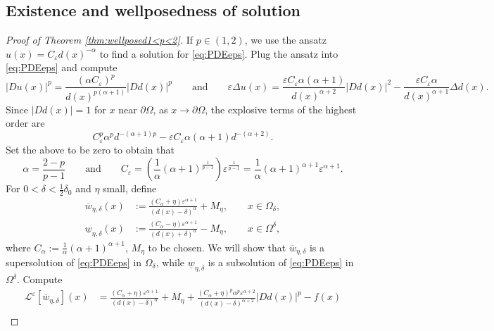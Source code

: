 \documentclass[12pt,reqno]{amsart}
\numberwithin{figure}{section}
\theoremstyle{plain}
\theoremstyle{remark}
\numberwithin{equation}{section}
\begin{document}
\subsection*{Existence and wellposedness of solution}
\begin{proof} [Proof of Theorem \ref{thm:wellposed1<p<2}] If $p\in (1,2)$, we use the ansatz $ u(x) = C_\varepsilon d(x)^{-\alpha}$ to find a solution for \eqref{eq:PDEeps}. Plug the ansatz into \eqref{eq:PDEeps} and compute 
\begin{equation*}
    |Du (x)|^p = \frac{(\alpha C_\varepsilon)^p }{d(x)^{p(\alpha+1)}}|D d(x)|^p \qquad\text{and}\qquad\varepsilon\Delta u(x) = \frac{\varepsilon C_\varepsilon\alpha(\alpha+1)}{d(x)^{\alpha+2}}|D d(x)|^2 - \frac{\varepsilon C_\varepsilon\alpha}{d(x)^{\alpha+1}}\Delta d(x).
\end{equation*}
Since $|D d(x)| = 1$ for $x$ near $\partial\Omega$, as $x\to \partial \Omega$, the explosive terms of the highest order are
\begin{equation*}
         C_\varepsilon^p \alpha^p d^{-(\alpha+1)p}  -\varepsilon C_\varepsilon \alpha(\alpha+1)d^{-(\alpha+2)}.
\end{equation*}
Set the above to be zero to obtain that
\begin{equation}\label{e:relation}
    \displaystyle\alpha = \frac{2-p}{p-1} \qquad\text{and}\qquad C_\varepsilon = \left(\frac{1}{\alpha}(\alpha+1)^\frac{1}{p-1}\right) \varepsilon^{\frac{1}{p-1}} = \frac{1}{\alpha}(\alpha+1)^{\alpha+1}\varepsilon^{\alpha+1}.
\end{equation}
For $0<\delta < \frac{1}{2}\delta_0$ and $\eta$ small, define
\begin{equation*}
\begin{split}
    \overline{w}_{\eta,\delta}(x) &:= \frac{(C_\alpha+\eta)\varepsilon^{\alpha+1}}{(d(x)-\delta)^\alpha} + M_\eta, \qquad x\in \Omega_\delta,\\
    \underline{w}_{\eta,\delta}(x) &:= \frac{(C_\alpha-\eta)\varepsilon^{\alpha+1}}{(d(x)+\delta)^\alpha} - M_\eta, \qquad x\in \Omega^\delta,
\end{split}
\end{equation*}
where $C_\alpha := \frac{1}{\alpha} (\alpha+1)^{\alpha+1} $, $M_\eta$ to be chosen. We will show that $\overline{w}_{\eta,\delta}$ is a supersolution of \eqref{eq:PDEeps} in $\Omega_\delta$, while $\underline{w}_{\eta,\delta}$ is a subsolution of \eqref{eq:PDEeps} in $\Omega^\delta$. Compute
\begin{align*}
    \mathcal{L}^\varepsilon\left[\overline{w}_{\eta,\delta}\right](x) &= \frac{ (C_\alpha + \eta)\varepsilon^{\alpha+1}}{(d(x)-\delta)^\alpha} + M_\eta + \frac{(C_\alpha+\eta)^p \alpha^p\varepsilon^{\alpha+2}}{(d(x)-\delta)^{\alpha+2}}|D d(x)|^p - f(x) \\

\end{align*}
\end{proof}
\end{document}
